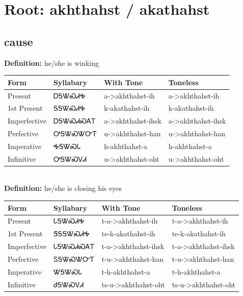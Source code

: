 \documentclass{article}%
\begin{document}
%
\normalsize%
\section*{Root: akhthahst / akathahst}%
\subsection*{cause}%
\textbf{Definition: }%
he/she is winking%
\\[0.5em]%
\begin{tabular}{|l|l|l|l|}%
\hline%
\textbf{Form}&\textbf{Syllabary}&\textbf{With Tone}&\textbf{Toneless}\\%
\hline%
Present&ᎠᎦᏔᏍᏗᎭ&a{-}>akhthahst{-}ih&a{-}>akhthahst{-}ih\\%
1st Present&ᎦᎦᏔᏍᏗᎭ&k{-}akathahst{-}ih&k{-}akathahst{-}ih\\%
Imperfective&ᎠᎦᏔᏍᏗᏍᎪᎢ&a{-}>akhthahst{-}ihsk&a{-}>akhthahst{-}ihsk\\%
Perfective&ᎤᎦᏔᏍᏔᏅᎢ&u{-}>akhthahst{-}han&u{-}>akhthahst{-}han\\%
Imperative&ᎭᎦᏔᏍᏓ&h{-}akhthahst{-}a&h{-}akhthahst{-}a\\%
Infinitive&ᎤᎦᏔᏍᏙᏗ&u{-}>akhthahst{-}oht&u{-}>akhthahst{-}oht\\%
\hline%
\end{tabular}%
\\[1em]%
\textbf{Definition: }%
he/she is closing his eyes%
\\[0.5em]%
\begin{tabular}{|l|l|l|l|}%
\hline%
\textbf{Form}&\textbf{Syllabary}&\textbf{With Tone}&\textbf{Toneless}\\%
\hline%
Present&ᏓᎦᏔᏍᏗᎭ&t{-}a{-}>akhthahst{-}ih&t{-}a{-}>akhthahst{-}ih\\%
1st Present&ᏕᎦᎦᏔᏍᏗᎭ&te{-}k{-}akathahst{-}ih&te{-}k{-}akathahst{-}ih\\%
Imperfective&ᏓᎦᏔᏍᏗᏍᎪᎢ&t{-}a{-}>akhthahst{-}ihsk&t{-}a{-}>akhthahst{-}ihsk\\%
Perfective&ᏚᎦᏔᏍᏔᏅᎢ&t{-}u{-}>akhthahst{-}han&t{-}u{-}>akhthahst{-}han\\%
Imperative&ᏔᎦᏔᏍᏓ&t{-}h{-}akhthahst{-}a&t{-}h{-}akhthahst{-}a\\%
Infinitive&ᏧᎦᏔᏍᏙᏗ&ts{-}u{-}>akhthahst{-}oht&ts{-}u{-}>akhthahst{-}oht\\%
\hline%
\end{tabular}%
\\[1em]%
\end{document}
